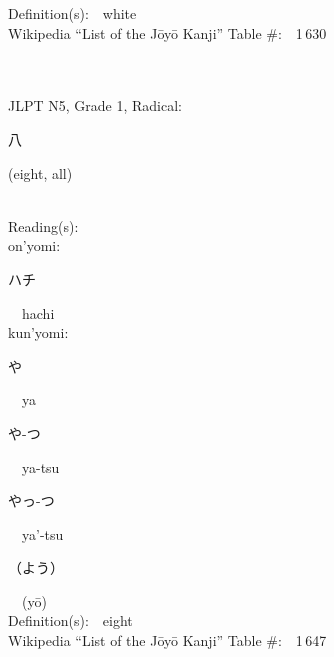 \begin{multicols}{2}
Definition(s):\ \ white \\
Wikipedia ``List of the J\=oy\=o Kanji'' Table \#:\ \ 1\,630 \\
\ \ \\
{\fontsize{34pt}{40pt}  }\ \ \\  %
{JLPT N5, Grade 1, Radical:\ \ {\begin{CJK}{UTF8}{min} 八 \end{CJK}} (eight, all) } \\
Reading(s):\ \ \\
{\hspace*{1em}}on'yomi:\ \ \\
{\hspace*{2em}}{\begin{CJK}{UTF8}{min} ハチ \end{CJK}}\ \ hachi\ \ \\
{\hspace*{1em}}kun'yomi:\ \ \\
{\hspace*{2em}}{\begin{CJK}{UTF8}{min} や \end{CJK}}\ \ ya\ \ \\
{\hspace*{2em}}{\begin{CJK}{UTF8}{min} や-つ \end{CJK}}\ \ ya-tsu\ \ \\
{\hspace*{2em}}{\begin{CJK}{UTF8}{min} やっ-つ \end{CJK}}\ \ ya'-tsu\ \ \\
{\hspace*{2em}}{\begin{CJK}{UTF8}{min} （よう） \end{CJK}}\ \ (y\=o)\ \ \\
Definition(s):\ \ eight \\
Wikipedia ``List of the J\=oy\=o Kanji'' Table \#:\ \ 1\,647 \\
\ \ \\
{\fontsize{34pt}{40pt}  }\ \ \\  %

\end{multicols}
